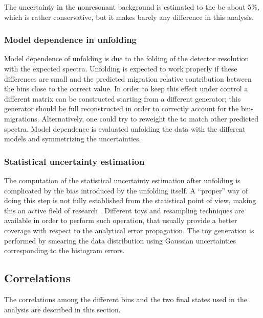 The uncertainty in the nonresonant background is estimated to the be 
about 5\%, which is rather conservative, but it makes barely any difference in
this analysis.

\subsubsection{Model dependence in unfolding}

Model dependence of unfolding is due to the folding of the detector resolution 
with the expected spectra. Unfolding is expected to work properly if these 
differences are small and the predicted migration relative contribution between 
the bins close to the correct value. In order to keep this effect under control 
a different matrix can be constructed starting from a different \MC{} generator; 
this generator should be full reconstructed in order to correctly account for 
the bin-migrations. Alternatively, one could try to reweight the \MC{} to 
match other predicted spectra. 
Model dependence is evaluated unfolding the data with the different models and 
symmetrizing the uncertainties.

\subsubsection{Statistical uncertainty estimation}

The computation of the statistical uncertainty estimation after unfolding is 
complicated by the bias introduced by the unfolding itself. A ``proper'' way 
of doing this step is not fully established from the statistical point of view, 
making this an active field of research \cite{Prosper:2011zz,kuusela}.
Different toys and resampling techniques are available in order to perform such 
operation, that usually provide a better coverage with respect to the analytical 
error propagation. The toy generation is performed by \RooUnfold{} smearing the 
data distribution using Gaussian uncertainties corresponding to the histogram 
errors.

\subsection{Correlations} 
The correlations among the different bins and the two final states used in the 
analysis are described in this section.

